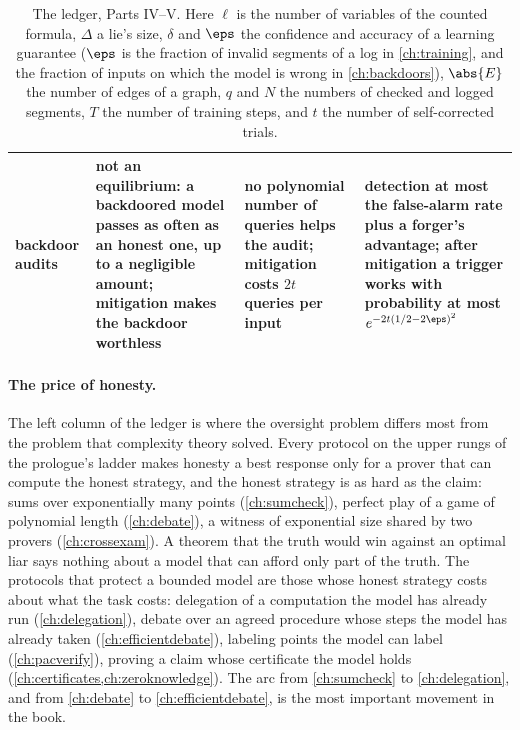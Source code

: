 \begin{refsection}
\begin{table}[p]
\begin{fullwidth}
\begin{tabularx}{\linewidth}{@{}>{\raggedright\arraybackslash}p{24mm}>{\raggedright\arraybackslash}X>{\raggedright\arraybackslash}X>{\raggedright\arraybackslash}X@{}}
15\enspace backdoor audits & not an equilibrium: a backdoored model passes as often as an honest one, up to a negligible amount; mitigation makes the backdoor worthless & no polynomial number of queries helps the audit; mitigation costs $2t$ queries per input & detection at most the false-alarm rate plus a forger's advantage; after mitigation a trigger works with probability at most $e^{-2t(1/2-2\eps)^2}$ \\
\bottomrule
\end{tabularx}
\end{fullwidth}
\caption{The ledger, Parts IV--V. Here $\ell$ is the number of variables of the counted formula, $\Delta$ a lie's size, $\delta$ and $\eps$ the confidence and accuracy of a learning guarantee ($\eps$ is the fraction of invalid segments of a log in \cref{ch:training}, and the fraction of inputs on which the model is wrong in \cref{ch:backdoors}), $\abs{E}$ the number of edges of a graph, $q$ and $N$ the numbers of checked and logged segments, $T$ the number of training steps, and $t$ the number of self-corrected trials.}\label{tab:epilogue:ledger2}
\end{table}


\paragraph{The price of honesty.} The left column of the ledger is where the oversight problem differs most from the problem that complexity theory solved. Every protocol on the upper rungs of the prologue's ladder makes honesty a best response only for a prover that can compute the honest strategy, and the honest strategy is as hard as the claim: sums over exponentially many points (\cref{ch:sumcheck}), perfect play of a game of polynomial length (\cref{ch:debate}), a witness of exponential size shared by two provers (\cref{ch:crossexam}). A theorem that the truth would win against an optimal liar says nothing about a model that can afford only part of the truth. The protocols that protect a bounded model are those whose honest strategy costs about what the task costs: delegation of a computation the model has already run (\cref{ch:delegation}), debate over an agreed procedure whose steps the model has already taken (\cref{ch:efficientdebate}), labeling points the model can label (\cref{ch:pacverify}), proving a claim whose certificate the model holds (\cref{ch:certificates,ch:zeroknowledge}). The arc from \cref{ch:sumcheck} to \cref{ch:delegation}, and from \cref{ch:debate} to \cref{ch:efficientdebate}, is the most important movement in the book.


\end{refsection}
